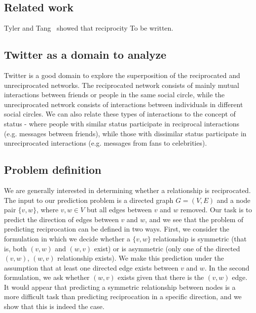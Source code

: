 \documentclass[conference]{IEEEtran}
\begin{document}
\subsection{Related work}
Tyler and Tang~\cite{TylerTang} showed that reciprocity 
To be written.

\subsection{Twitter as a domain to analyze}
Twitter is a good domain to explore the superposition of the reciprocated and unreciprocated networks. 
The reciprocated network consists of mainly mutual interactions between friends or people in the same social circle, while the unreciprocated network consists of interactions between individuals in different social circles. 
We can also relate these types of interactions to the concept of status - where people with similar status participate in reciprocal interactions (e.g. messages between friends), while those with dissimilar status participate in unreciprocated interactions (e.g. messages from fans to celebrities).

\subsection{Problem definition}
We are generally interested in determining whether a relationship is reciprocated.
The input to our prediction problem is a directed graph $G=(V,E)$ and a node pair $\{v,w\}$, where $v,w \in V$ but all edges between $v$ and $w$ removed. 
Our task is to predict the direction of edges between $v$ and $w$, and we see that the problem of predicting reciprocation can be defined in two ways. 
First, we consider the formulation in which we decide whether a $\{v,w\}$ relationship is symmetric (that is, both $(v,w)$ and $(w,v)$ exist) or is asymmetric (only one of the directed $(v,w)$, $(w,v)$ relationship exists).
We make this prediction under the assumption that at least one directed edge exists between $v$ and $w$. 
In the second formulation, we ask whether $(w,v)$ exists given that there is the $(v,w)$ edge. 
It would appear that predicting a symmetric relationship between nodes is a more difficult task than predicting reciprocation in a specific direction, and we show that this is indeed the case.
\end{document}
